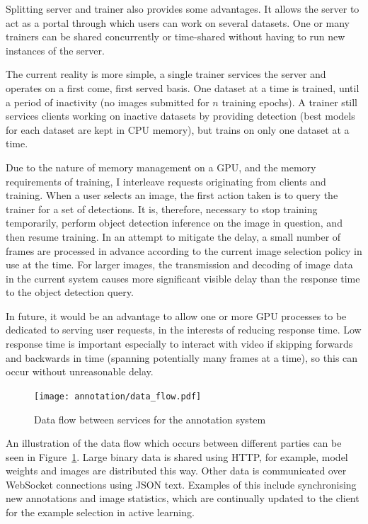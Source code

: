 Splitting server and trainer also provides some advantages. It allows the server to act as a portal through which users can work on several datasets. One or many trainers can be shared concurrently or time-shared without having to run new instances of the server. 

The current reality is more simple, a single trainer services the server and operates on a first come, first served basis. One dataset at a time is trained, until a period of inactivity (no images submitted for $ n $ training epochs). A trainer still services clients working on inactive datasets by providing detection (best models for each dataset are kept in \gls{CPU} memory), but trains on only one dataset at a time. 

Due to the nature of memory management on a \gls{GPU}, and the memory requirements of training, I interleave requests originating from clients and training. When a user selects an image, the first action taken is to query the trainer for a set of detections. It is, therefore, necessary to stop training temporarily, perform object detection inference on the image in question, and then resume training. In an attempt to mitigate the delay, a small number of frames are processed in advance according to the current image selection policy in use at the time. For larger images, the transmission and decoding of image data in the current system causes more significant visible delay than the response time to the object detection query.

In future, it would be an advantage to allow one or more \gls{GPU} processes to be dedicated to serving user requests, in the interests of reducing response time. Low response time is important especially to interact with video if skipping forwards and backwards in time (spanning potentially many frames at a time), so this can occur without unreasonable delay.

\begin{figure}[htb!]
  \centering
  \texttt{[image: annotation/data\_flow.pdf]}
  \caption{Data flow between services for the annotation system}  
  \label{fig:data_flow}
\end{figure}

An illustration of the data flow which occurs between different parties can be seen in Figure~\ref{fig:data_flow}. Large binary data is shared using \gls{HTTP}, for example, model weights and images are distributed this way. Other data is communicated over WebSocket connections using \gls{JSON} text. Examples of this include synchronising new annotations and image statistics, which are continually updated to the client for the example selection in active learning.

